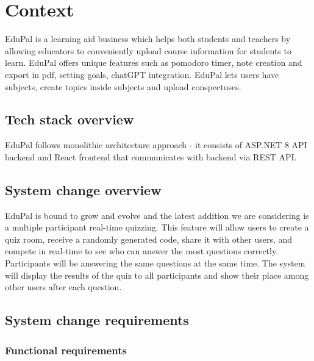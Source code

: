 \section{Context}

EduPal is a learning aid business which helps both students and teachers by allowing educators to conveniently upload course information for students to learn. EduPal offers unique features such as pomodoro timer, note creation and export in pdf, setting goals, chatGPT integration. EduPal lets users have subjects, create topics inside subjects and upload conspectuses.

\subsection{Tech stack overview}

EduPal follows monolithic architecture approach - it consists of ASP.NET 8 API backend and React frontend that communicates with backend via REST API.

\subsection{System change overview}

EduPal is bound to grow and evolve and the latest addition we are considering is a multiple participant real-time quizzing. This feature will allow users to create a quiz room, receive a randomly generated code, share it with other users, and compete in real-time to see who can answer the most questions correctly. Participants will be answering the same questions at the same time. The system will display the results of the quiz to all participants and show their place among other users after each question.

\subsection{System change requirements}

\subsubsection{Functional requirements}


